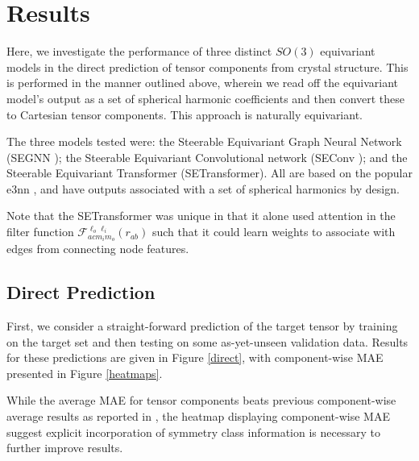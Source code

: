 \documentclass[10pt,a4paper]{article}
\begin{document}
\section{Results}
Here, we investigate the performance of three distinct $SO(3)$ equivariant models in the direct prediction of tensor components from crystal structure. This is performed in the manner outlined above, wherein we read off the equivariant model's output as a set of spherical harmonic coefficients and then convert these to Cartesian tensor components. This approach is naturally equivariant.

The three models tested were: the Steerable Equivariant Graph Neural Network (SEGNN \cite{segnn}); the Steerable Equivariant Convolutional network (SEConv \cite{seconv}); and the Steerable Equivariant Transformer (SETransformer\cite{sestranform}). All are based on the popular e3nn \cite{e3nn}, and have outputs associated with a set of spherical harmonics by design.

Note that the SETransformer was unique in that it alone used attention in the filter function $\mathcal{F}_{acm_im_o}^{\ell_o\ell_i}(r_{ab})$ such that it could learn weights to associate with edges from connecting node features. 







\subsection{Direct Prediction}
First, we consider a straight-forward prediction of the target tensor by training on the target set and then testing on some as-yet-unseen validation data. Results for these predictions are given in Figure \ref{direct}, with component-wise MAE presented in Figure \ref{heatmaps}.

While the average MAE for tensor components beats previous component-wise average results as reported in \cite{strainnet}, the heatmap displaying component-wise MAE suggest explicit incorporation of symmetry class information is necessary to further improve results.
\end{document}
